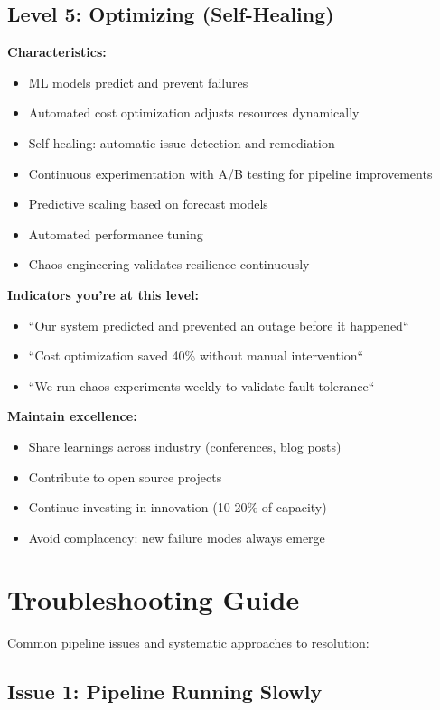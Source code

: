 \subsection{Level 5: Optimizing (Self-Healing)}

\textbf{Characteristics:}
\begin{itemize}
    \item ML models predict and prevent failures
    \item Automated cost optimization adjusts resources dynamically
    \item Self-healing: automatic issue detection and remediation
    \item Continuous experimentation with A/B testing for pipeline improvements
    \item Predictive scaling based on forecast models
    \item Automated performance tuning
    \item Chaos engineering validates resilience continuously
\end{itemize}

\textbf{Indicators you're at this level:}
\begin{itemize}
    \item ``Our system predicted and prevented an outage before it happened``
    \item ``Cost optimization saved 40\% without manual intervention``
    \item ``We run chaos experiments weekly to validate fault tolerance``
\end{itemize}

\textbf{Maintain excellence:}
\begin{itemize}
    \item Share learnings across industry (conferences, blog posts)
    \item Contribute to open source projects
    \item Continue investing in innovation (10-20\% of capacity)
    \item Avoid complacency: new failure modes always emerge
\end{itemize}

\section{Troubleshooting Guide}

Common pipeline issues and systematic approaches to resolution:

\subsection{Issue 1: Pipeline Running Slowly}


